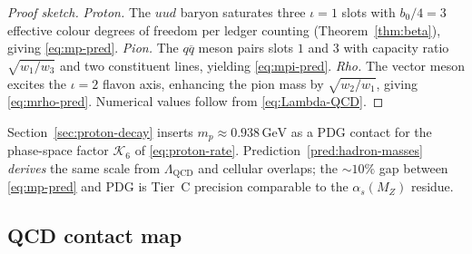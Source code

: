 \begin{proof}[Proof sketch]
\emph{Proton.} The $uud$ baryon saturates three $\iota=1$ slots with
$b_0/4=3$ effective colour degrees of freedom per ledger counting
(Theorem~\ref{thm:beta}), giving \eqref{eq:mp-pred}.
\emph{Pion.} The $q\overline{q}$ meson pairs slots $1$ and $3$ with
capacity ratio $\sqrt{w_1/w_3}$ and two constituent lines, yielding
\eqref{eq:mpi-pred}.
\emph{Rho.} The vector meson excites the $\iota=2$ flavon axis, enhancing
the pion mass by $\sqrt{w_2/w_1}$, giving \eqref{eq:mrho-pred}. Numerical
values follow from \eqref{eq:Lambda-QCD}.
\end{proof}

\begin{remark}
Section~\ref{sec:proton-decay} inserts $m_p\approx 0.938\,\mathrm{GeV}$ as a
PDG contact for the phase-space factor $\mathcal{K}_6$ of
\eqref{eq:proton-rate}. Prediction~\ref{pred:hadron-masses} \emph{derives}
the same scale from $\Lambda_{\mathrm{QCD}}$ and cellular overlaps; the
$\sim 10\%$ gap between \eqref{eq:mp-pred} and PDG is Tier~C precision
comparable to the $\alpha_s(M_Z)$ residue.
\end{remark}

\subsection{QCD contact map}
\label{sec:qcd:table}

